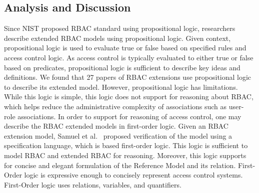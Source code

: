 \subsection{Analysis and Discussion}

Since NIST proposed RBAC standard using propositional logic, researchers describe extended RBAC models using propositional logic. Given context, propositional logic is used to evaluate true or false based on specified rules and access control logic. As access control is typically evaluated to either true or false based on predicates, propositional logic is sufficient to describe key ideas and definitions. We found that 27 papers of RBAC extensions use propositional logic to describe its extended model.
However, propositional logic has limitations. While this logic is simple, this logic does not support for reasoning about RBAC, which helps
reduce the administrative complexity of associations such as user- role associations.
In order to support for reasoning of access control, one may describe the RBAC extended models in first-order logic. 
Given an RBAC extension model, Samuel et al.~\cite{samuel07:spatio-temporal} proposed verification of the model using a specification language, which is based first-order logic. This logic is sufficient to model RBAC and extended RBAC for reasoning. Moreover, this logic supports for concise and elegant formulation of the Reference Model and its relation.  First-Order logic is expressive enough to concisely represent access control systems. First-Order logic uses relations, variables, and quantifiers.
